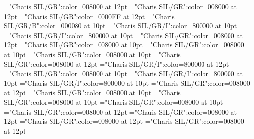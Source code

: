 \documentclass[a4paper,twoside]{article}
\begin{document}
\font{}="Charis SIL/GR":color=008000 at 12pt
\font{}="Charis SIL/GR":color=008000 at 12pt
\font\headwordreferencedentryreferencedentriesvisiblevariantentryrefvisiblevariantentryrefsminorentryvariantletDatadicBody="Charis SIL/GR":color=0000FF at 12pt
\font\spanmxbheadwordreferencedentryreferencedentriesvisiblevariantentryrefvisiblevariantentryrefsminorentryvariantletDatadicBody="Charis SIL/GR/B":color=000080 at 10pt
\font\spanspanmxbheadwordreferencedentryreferencedentriesvisiblevariantentryrefvisiblevariantentryrefsminorentryvariantletDatadicBody="Charis SIL/GR/I":color=800000 at 10pt
\font\spanheadwordreferencedentryreferencedentriesvisiblevariantentryrefvisiblevariantentryrefsminorentryvariantletDatadicBody="Charis SIL/GR/I":color=800000 at 10pt
\font\summarydefinitionminorentryvariantletDatadicBody="Charis SIL/GR":color=008000 at 12pt
\font\spanessummarydefinitionminorentryvariantletDatadicBody="Charis SIL/GR":color=008000 at 10pt
\font\spanspanessummarydefinitionminorentryvariantletDatadicBody="Charis SIL/GR":color=008000 at 10pt
\font\spansummarydefinitionminorentryvariantletDatadicBody="Charis SIL/GR":color=008000 at 10pt
\font\morphosyntaxanalysissensesensecontentsensesentryletDatadicBody="Charis SIL/GR":color=008000 at 12pt
\font\partofspeechmorphosyntaxanalysissensesensecontentsensesentryletDatadicBody="Charis SIL/GR/I":color=800000 at 12pt
\font\spanespartofspeechmorphosyntaxanalysissensesensecontentsensesentryletDatadicBody="Charis SIL/GR":color=008000 at 10pt
\font\spanspanespartofspeechmorphosyntaxanalysissensesensecontentsensesentryletDatadicBody="Charis SIL/GR/I":color=800000 at 10pt
\font\spanpartofspeechmorphosyntaxanalysissensesensecontentsensesentryletDatadicBody="Charis SIL/GR/I":color=800000 at 10pt
\font{}="Charis SIL/GR":color=008000 at 12pt
\font\spanesdefinitionsensesensecontentsensesentryletDatadicBody="Charis SIL/GR":color=008000 at 10pt
\font\spanspanesdefinitionsensesensecontentsensesentryletDatadicBody="Charis SIL/GR":color=008000 at 10pt
\font\spandefinitionsensesensecontentsensesentryletDatadicBody="Charis SIL/GR":color=008000 at 10pt
\font\pictureentryletDatadicBody="Charis SIL/GR":color=008000 at 12pt
\font\thumbnailpictureentryletDatadicBody="Charis SIL/GR":color=008000 at 12pt
\font\captionContentpictureentryletDatadicBody="Charis SIL/GR":color=008000 at 12pt
\font\captioncaptionContentpictureentryletDatadicBody="Charis SIL/GR":color=008000 at 12pt
\end{document}
